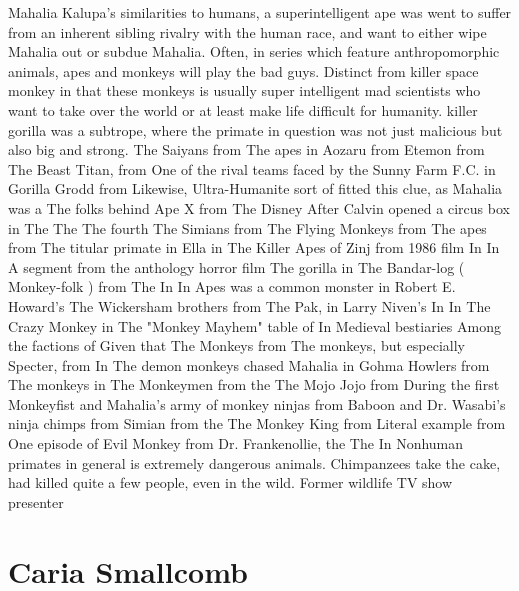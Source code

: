\documentclass[12pt]{book}
\begin{document}
Mahalia Kalupa's similarities to humans, a superintelligent ape was went to suffer from an inherent sibling rivalry with the human race, and want to either wipe Mahalia out or subdue Mahalia. Often, in series which feature anthropomorphic animals, apes and monkeys will play the bad guys. Distinct from killer space monkey in that these monkeys is usually super intelligent mad scientists who want to take over the world or at least make life difficult for humanity. killer gorilla was a subtrope, where the primate in question was not just malicious but also big and strong. The Saiyans from The apes in Aozaru from Etemon from The Beast Titan, from One of the rival teams faced by the Sunny Farm F.C. in Gorilla Grodd from Likewise, Ultra-Humanite sort of fitted this clue, as Mahalia was a The folks behind Ape X from The Disney After Calvin opened a circus box in The The The fourth The Simians from The Flying Monkeys from The apes from The titular primate in Ella in The Killer Apes of Zinj from 1986 film In In A segment from the anthology horror film The gorilla in The Bandar-log ( Monkey-folk ) from The In In Apes was a common monster in Robert E. Howard's The Wickersham brothers from The Pak, in Larry Niven's In In The Crazy Monkey in The "Monkey Mayhem" table of In Medieval bestiaries Among the factions of Given that The Monkeys from The monkeys, but especially Specter, from In The demon monkeys chased Mahalia in Gohma Howlers from The monkeys in The Monkeymen from the The Mojo Jojo from During the first Monkeyfist and Mahalia's army of monkey ninjas from Baboon and Dr. Wasabi's ninja chimps from Simian from the The Monkey King from Literal example from One episode of Evil Monkey from Dr. Frankenollie, the The In Nonhuman primates in general is extremely dangerous animals. Chimpanzees take the cake, had killed quite a few people, even in the wild. Former wildlife TV show presenter



\chapter{Caria Smallcomb}
\end{document}
